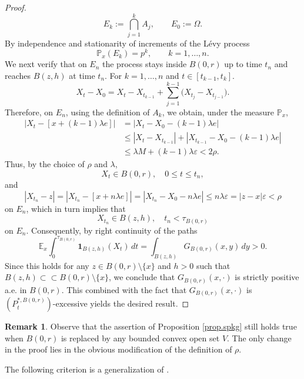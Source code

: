 \documentclass[11pt,a4paper,reqno]{amsart}
\theoremstyle{definition}
\newtheorem{remark}[theorem]{Remark}
\numberwithin{equation}{section}
\begin{document}
\begin{proof}
\[
E_k:=\bigcap_{j=1}^{k}A_j,
\qquad E_0:=\Omega.
\]
By independence and stationarity of increments of the L\'evy process
\begin{equation}
\label{eq.iterated-probability}
\mathbb{P}_x(E_k)=p^k,
\qquad k=1,\ldots,n.
\end{equation}
We next verify that on $E_n$ the process stays inside $B(0,r)$ up to
time $t_n$ and reaches $B(z,h)$ at time $t_n$. For $k=1,\ldots,n$ and  $t\in[t_{k-1},t_{k}]$.
\[
X_{t}-X_0
=
X_t-X_{t_{k-1}}+\sum_{j=1}^{k-1}
\bigl(X_{t_j}-X_{t_{j-1}}\bigr).
\]
Therefore,  on $E_n$, using the definition of $A_k$, we obtain, under the measure $\mathbb P_x$,
\[
\begin{split}
\left|
X_t-[x+(k-1)\lambda e]
\right|&=\left|
X_t-X_0-(k-1)\lambda e
\right|
\\&\leq
|X_t-X_{t_{k-1}}|+
\left|
X_{t_{k-1}}-X_0
-(k-1)\lambda e
\right|\\&\leq
\lambda M+(k-1)\lambda\varepsilon<2\rho.
\end{split}
\]
Thus, by the choice of $\rho$ and $\lambda$,
\[
X_t\in B(0,r),
\quad 0\leq t\leq t_n,
\]
and
\[
|X_{t_n}-z|=|X_{t_n}-[x+n\lambda e]|=|X_{t_n}-X_0-n\lambda e| \le  n\lambda\varepsilon
=
|z-x|\varepsilon
<\rho
\]
on $E_n$, which in turn implies that
\[
X_{t_n}\in B(z,h),\quad t_n<\tau_{B(0,r)}
\]
on $E_n$. Consequently, by right continuity of the paths
\[
\mathbb{E}_x
\int_0^{\tau_{B(0,r)}}\mathbf{1}_{B(z,h)}(X_t)\,dt=\int_{B(z,h)} G_{B(0,r)}(x,y)\,dy>0.
\]
Since this holds  for any $z\in B(0,r)\setminus \{x\}$ and $h>0$ such that $B(z,h)\subset\subset B(0,r)\setminus\{x\}$,
we conclude that $G_{B(0,r)}(x,\cdot)$ is strictly positive a.e. in $B(0,r)$. This combined with the fact that $G_{B(0,r)}(x,\cdot)$
is $(P^{*,B(0,r)}_t)$-excessive  yields the desired result.  
\end{proof}

\begin{remark}
\label{rem.any1}
Observe that the assertion of Proposition \ref{prop.spkg} still holds true when $B(0,r)$ is replaced by any bounded 
convex open set $V$. The only change in the proof  lies in the obvious modification of the definition of $\rho$.
\end{remark}

The following criterion is a generalization of \cite[Theorem 1.3]{ChenHuZhao2025}.
\end{document}

